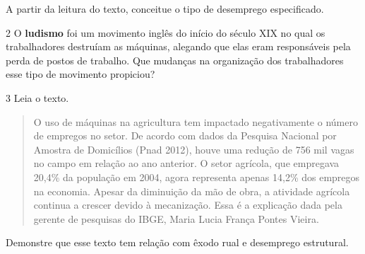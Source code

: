 A partir da leitura do texto, conceitue o tipo de desemprego
especificado.


\num{2} O \textbf{ludismo} foi um movimento inglês do início do século
XIX no qual os trabalhadores destruíam as máquinas, alegando que elas
eram responsáveis pela perda de postos de trabalho. Que mudanças na
organização dos trabalhadores esse tipo de movimento propiciou?


\num{3} Leia o texto.

\begin{quote}
O uso de máquinas na agricultura tem impactado negativamente o número de
empregos no setor. De acordo com dados da Pesquisa Nacional por Amostra
de Domicílios (Pnad 2012), houve uma redução de 756 mil vagas no campo
em relação ao ano anterior. O setor agrícola, que empregava 20,4\% da
população em 2004, agora representa apenas 14,2\% dos empregos na
economia. Apesar da diminuição da mão de obra, a atividade agrícola
continua a crescer devido à mecanização. Essa é a explicação dada pela
gerente de pesquisas do IBGE, Maria Lucia França Pontes Vieira.
\end{quote}


Demonstre que esse texto tem relação com êxodo rual e desemprego
estrutural.

